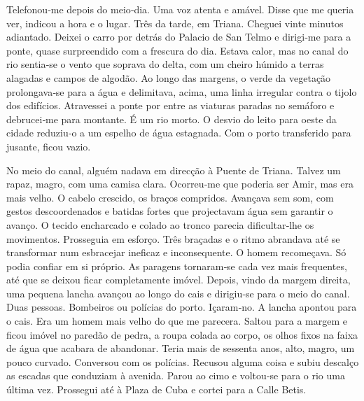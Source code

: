 Telefonou­‑me depois do meio­‑dia. Uma voz atenta e amável. Disse que me
queria ver, indicou a hora e o lugar. Três da tarde, em Triana. Cheguei
vinte minutos adiantado. Deixei o carro por detrás do Palacio de San
Telmo e dirigi­‑me para a ponte, quase surpreendido com a frescura do
dia. Estava calor, mas no canal do rio sentia­‑se o vento que soprava do
delta, com um cheiro húmido a terras alagadas e campos de algodão. Ao
longo das margens, o verde da vegetação prolongava­‑se para a água e
delimitava, acima, uma linha irregular contra o tijolo dos edifícios.
Atravessei a ponte por entre as viaturas paradas no semáforo e
debrucei­‑me para montante. É um rio morto. O desvio do leito para oeste
da cidade reduziu­‑o a um espelho de água estagnada. Com o porto
transferido para jusante, ficou vazio.

No meio do canal, alguém nadava em direcção à Puente de Triana. Talvez
um rapaz, magro, com uma camisa clara. Ocorreu­‑me que poderia ser Amir,
mas era mais velho. O cabelo crescido, os braços compridos. Avançava sem
som, com gestos descoordenados e batidas fortes que projectavam água sem
garantir o avanço. O tecido encharcado e colado ao tronco parecia
dificultar­‑lhe os movimentos. Prosseguia em esforço. Três braçadas e o
ritmo abrandava até se transformar num esbracejar ineficaz e
inconsequente. O homem recomeçava. Só podia confiar em si próprio. As
paragens tornaram­‑se cada vez mais frequentes, até que se deixou ficar
completamente imóvel. Depois, vindo da margem direita, uma pequena
lancha avançou ao longo do cais e dirigiu­‑se para o meio do canal. Duas
pessoas. Bombeiros ou polícias do porto. Içaram­‑no. A lancha apontou
para o cais. Era um homem mais velho do que me parecera. Saltou para a
margem e ficou imóvel no paredão de pedra, a roupa colada ao corpo, os
olhos fixos na faixa de água que acabara de abandonar. Teria mais de
sessenta anos, alto, magro, um pouco curvado. Conversou com os polícias.
Recusou alguma coisa e subiu descalço as escadas que conduziam à
avenida. Parou ao cimo e voltou­‑se para o rio uma última vez. Prossegui
até à Plaza de Cuba e cortei para a Calle Betis.

